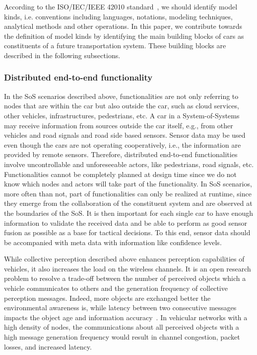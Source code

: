 According to the ISO/IEC/IEEE 42010 standard~\cite{42010}, we should identify model kinds, i.e. conventions
including languages, notations, modeling techniques, analytical methods and other
operations. In this paper, we contribute towards the definition of model kinds by identifying the 
main building blocks of cars as constituents of a future transportation system. These building blocks are described in the following subsections.

\subsubsection{Distributed end-to-end functionality} 
%

In the SoS scenarios described above, functionalities are not only referring to nodes that are within the car but also outside the car, such as cloud services, other vehicles, infrastructures, pedestrians, etc. A car in a System-of-Systems may receive information from sources outside the car itself, e.g., from other vehicles and road signals and road side based sensors. Sensor data may be used even though the cars are not operating cooperatively, i.e., the information are provided by remote sensors. Therefore, distributed end-to-end functionalities involve uncontrollable and unforeseeable actors, like pedestrians, road signals, etc. Functionalities cannot be completely planned at design time since we do not know which nodes and actors will take part of the functionality. In SoS scenarios, more often than not, part of functionalities can only be realized at runtime, since they emerge from the collaboration of the constituent system and are observed at the boundaries of the SoS. It is then important for each single car to have enough information to validate the received data and be able to perform as good sensor fusion as possible as a base for tactical decisions. To this end, sensor data should be accompanied with meta data with information like confidence levels.

While collective perception described above enhances perception capabilities
of vehicles, it also increases the load on the wireless channels. It is an open research problem to resolve a trade-off between the number of perceived objects which a vehicle communicates to others and the generation frequency of
collective perception messages. Indeed, more objects are exchanged better the environmental awareness is, while latency between two consecutive messages impacts the object age and information accuracy~\cite{Perception}. In vehicular networks with a high density of nodes, the communications about all perceived objects with
a high message generation frequency would result in channel congestion, packet losses, and increased latency.

